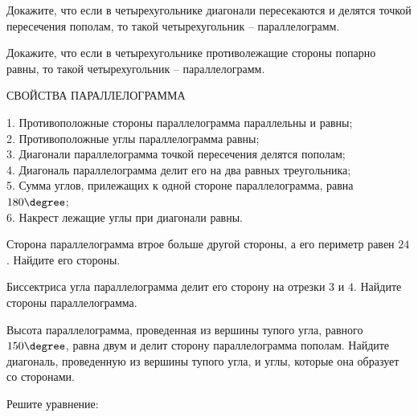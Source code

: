 \begin{class}[number=5]
	\begin{listofex}
		\item Докажите, что если в четырехугольнике диагонали пересекаются и делятся точкой	пересечения пополам, то такой четырехугольник – параллелограмм.
		\item Докажите, что если в четырехугольнике противолежащие стороны попарно равны, то такой четырехугольник – параллелограмм.
		\begin{center}
		СВОЙСТВА ПАРАЛЛЕЛОГРАММА \\
	\end{center}
			 1. Противоположные стороны параллелограмма параллельны и равны; \\
			 2. Противоположные углы параллелограмма равны;\\
			 3. Диагонали параллелограмма точкой пересечения делятся пополам; \\
			 4. Диагональ параллелограмма делит его на два равных треугольника; \\
			 5. Сумма углов, прилежащих к одной стороне параллелограмма, равна \( 180\degree \); \\
			 6. Накрест лежащие углы при диагонали равны.
		
		\item Сторона параллелограмма втрое больше другой стороны, а его периметр равен \( 24 \).	Найдите его стороны.
		\item Биссектриса угла параллелограмма делит его сторону на отрезки \( 3 \) и \( 4 \). Найдите стороны параллелограмма.
		\item Высота параллелограмма, проведенная из вершины тупого угла, равного \( 150\degree \), равна двум и делит сторону параллелограмма пополам. Найдите диагональ, проведенную из вершины тупого угла, и углы, которые она образует со сторонами.
		\item Решите уравнение:
		\begin{enumcols}[itemcolumns=2]
			\item {}
			\item {}
			\item {}
			\item {}
		\end{enumcols}
	\end{listofex}
\end{class}
%
%
